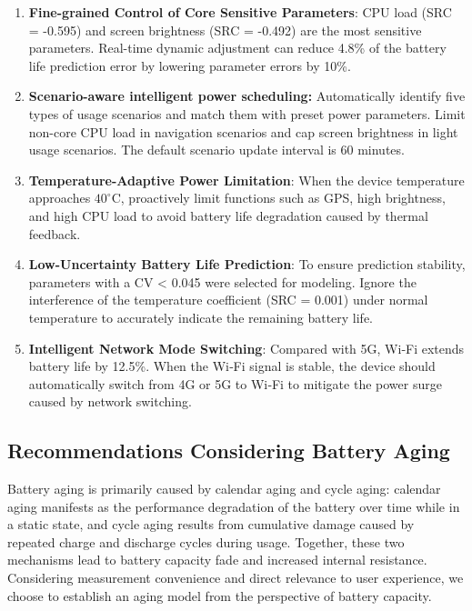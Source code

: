 \documentclass{mcmthesis}  %
\begin{document}
	
	\begin{enumerate}[label=\arabic*.]
		\item \textbf{Fine-grained Control of Core Sensitive Parameters}: CPU load (SRC = -0.595) and screen brightness (SRC = -0.492) are the most sensitive parameters. Real-time dynamic adjustment can reduce 4.8\% of the battery life prediction error by lowering parameter errors by 10\%.
		\item \textbf{Scenario-aware intelligent power scheduling:} Automatically identify five types of usage scenarios and match them with preset power parameters. Limit non-core CPU load in navigation scenarios and cap screen brightness in light usage scenarios. The default scenario update interval is 60 minutes.
		\item \textbf{Temperature-Adaptive Power Limitation}: When the device temperature approaches $40^\circ\mathrm{C}$, proactively limit functions such as GPS, high brightness, and high CPU load to avoid battery life degradation caused by thermal feedback.
		\item \textbf{Low-Uncertainty Battery Life Prediction}: To ensure prediction stability, parameters with a CV < 0.045 were selected for modeling. Ignore the interference of the temperature coefficient (SRC = 0.001) under normal temperature to accurately indicate the remaining battery life.
		\item \textbf{Intelligent Network Mode Switching}: Compared with 5G, Wi‑Fi extends battery life by 12.5\%. When the Wi‑Fi signal is stable, the device should automatically switch from 4G or 5G to Wi‑Fi to mitigate the power surge caused by network switching.
	\end{enumerate}
	
	
	\subsection{Recommendations Considering Battery Aging}
	
	
	Battery aging is primarily caused by calendar aging and cycle aging: calendar aging manifests as the performance degradation of the battery over time while in a static state, and cycle aging results from cumulative damage caused by repeated charge and discharge cycles during usage. Together, these two mechanisms lead to battery capacity fade and increased internal resistance. Considering measurement convenience and direct relevance to user experience, we choose to establish an aging model from the perspective of battery capacity.
	
\end{document}

